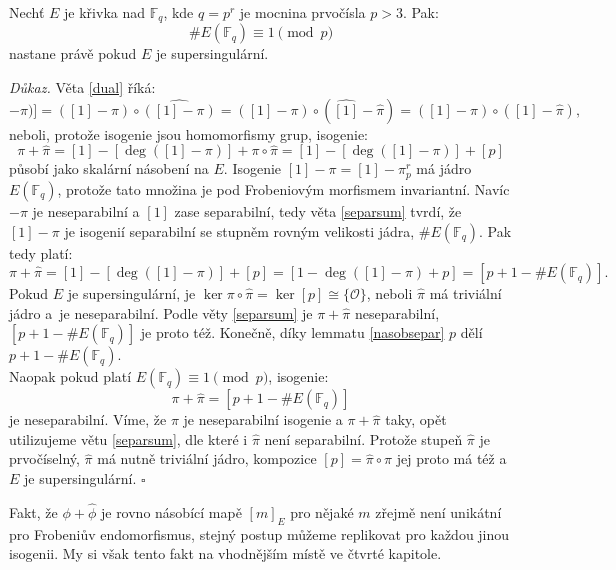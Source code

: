 \documentclass [12pt]{report}
\begin{document}
\begin{veta}\label{super}
Nechť $E$ je křivka nad $\mathbb{F}_q$, kde $q = p^r$ je mocnina prvočísla $p > 3$. Pak: $$\# E(\mathbb{F}_q) \equiv 1 \pmod{p}$$ nastane právě pokud $E$ je supersingulární.
\end{veta}

\noindent \textit{Důkaz.} Věta \ref{dual} říká:
\begin{equation*}
[\deg([1]-\pi)] = ([1]-\pi) \circ \widehat{([1]-\pi)} = ([1]-\pi) \circ (\widehat{[1]}-\widehat{\pi}) = ([1]-\pi) \circ ([1]-\widehat{\pi}),
\end{equation*} 
neboli, protože isogenie jsou homomorfismy grup, isogenie:
\begin{equation*}
\pi+\widehat{\pi} = [1] - [\deg([1]-\pi)]+\pi \circ \widehat{\pi} = [1]-[\deg([1]-\pi)]+[p]
\end{equation*}
působí jako skalární násobení na $E$. Isogenie $[1]-\pi = [1] - \pi_p ^r$ má jádro $E(\mathbb{F}_q)$, protože tato množina je pod Frobeniovým morfismem invariantní. Navíc $-\pi$ je neseparabilní a $[1]$ zase separabilní, tedy věta \ref{separsum} tvrdí, že $[1]-\pi$ je isogenií separabilní se stupněm rovným velikosti jádra, $\#E(\mathbb{F}_q)$. Pak tedy platí:
\begin{equation*}
\pi+\widehat{\pi}  = [1]-[\deg([1]-\pi)]+[p] = [1-\deg ([1]-\pi)+p] =  [p+1-\#E(\mathbb{F}_q)].
\end{equation*}
Pokud $E$ je supersingulární, je $\ker \pi \circ \widehat{\pi} = \ker [p] \cong \lbrace \mathcal{O} \rbrace$, neboli $\widehat{\pi}$ má triviální jádro a~je neseparabilní. Podle věty \ref{separsum} je $\pi+\widehat{\pi}$ neseparabilní, $[p+1-\#E(\mathbb{F}_q)]$ je proto též.  Konečně, díky lemmatu \ref{nasobsepar} $p$ dělí $p+1-\#E(\mathbb{F}_q)$.\\

Naopak pokud platí $E(\mathbb{F}_q) \equiv 1 \pmod{p}$, isogenie: $$\pi+\widehat{\pi} = [p+1-\#E(\mathbb{F}_q)]$$ je neseparabilní. Víme, že $\pi$ je neseparabilní isogenie a $\pi+\widehat{\pi}$ taky, opět utilizujeme větu \ref{separsum}, dle které i $\widehat{\pi}$ není separabilní. Protože stupeň $\widehat{\pi}$ je prvočíselný, $\widehat{\pi}$ má nutně triviální jádro, kompozice $[p] = \widehat{\pi} \circ \pi$ jej proto má též a $E$ je supersingulární. \hfill $\square$\\


\begin{poznamka}
Fakt, že $\phi+\widehat{\phi}$ je rovno násobící mapě $[m]_E$ pro nějaké $m$ zřejmě není unikátní pro Frobeniův endomorfismus, stejný postup můžeme replikovat pro každou jinou isogenii. My si však tento fakt  na vhodnějším místě ve čtvrté kapitole. 
\end{poznamka}
\end{document}
